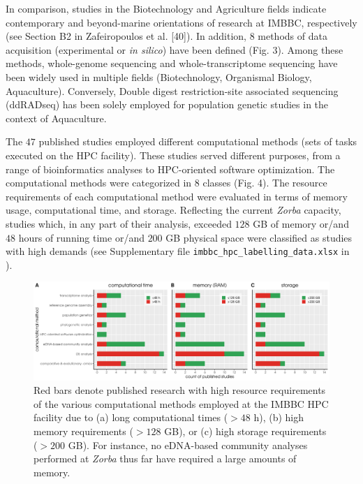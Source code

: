    In comparison, studies in the Biotechnology and Agriculture fields indicate contemporary and beyond-marine orientations of research at IMBBC, respectively (see Section B2 in Zafeiropoulos et al. [40]). 
   In addition, $8$ methods of data acquisition (experimental or \textit{in silico}) have been defined (Fig. 3). 
   Among these methods, whole-genome sequencing and whole-transcriptome sequencing have been widely used in multiple fields (Biotechnology, Organismal Biology, Aquaculture). 
   Conversely, Double digest restriction-site associated sequencing (ddRADseq) has been solely employed for population genetic studies in the context of Aquaculture.

   The $47$ published studies employed different computational methods (sets of tasks executed on the HPC facility). 
   These studies served different purposes, from a range of bioinformatics analyses to HPC-oriented software optimization. 
   The computational methods were categorized in $8$ classes (Fig. 4). 
   The resource requirements of each computational method were evaluated in terms of memory usage, computational time, and storage. Reflecting the current \textit{Zorba} capacity, studies which, in any part of their analysis, exceeded $128$ GB of memory or/and $48$ hours of running time or/and $200$ GB physical space were classified as studies with high demands (see Supplementary file \texttt{imbbc\_hpc\_labelling\_data.xlsx} in \citep{haris_zafeiropoulos_2021_4665308}).


   \begin{figure}
      \label{fig:resource}
      \centering
      \includegraphics[width=\columnwidth]{figures/computational_method_computational_requirement_plot.png}
      \caption[Computational resources requirements of the so-far published studies supported by the IMBBC HPC facility]{
         Red bars denote published research with high resource requirements of the various computational methods employed at the IMBBC HPC facility due to 
         (a) long computational times ($>48$ h), 
         (b) high memory requirements ($>128$ GB), or 
         (c) high storage requirements ($>200$ GB). 
         For instance, no eDNA-based community analyses performed at \textit{Zorba} thus far have required a large amounts of memory.}
   \end{figure}


